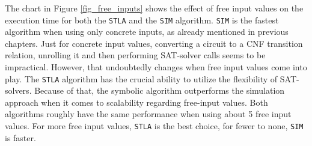 \documentclass[a4paper,10pt]{article}
\begin{document}
The chart in Figure \ref{fig_free_inputs} shows the effect of free input values on the execution time for both the \texttt{STLA} and the \texttt{SIM} algorithm.
\texttt{SIM} is the fastest algorithm when using only concrete inputs, as already mentioned in previous chapters. Just for concrete input values, converting a circuit to a CNF transition relation, unrolling it and then
performing SAT-solver calls seems to be impractical. However, that undoubtedly changes when free input values come into play. The \texttt{STLA} algorithm has the crucial ability to utilize the flexibility of SAT-solvers.
Because of that, the symbolic algorithm outperforms the simulation approach when it comes to scalability regarding free-input values. Both algorithms roughly have the same performance when using about 5 free input values.
For more free input values, \texttt{STLA} is the best choice, for fewer to none, \texttt{SIM} is faster.
\end{document}
